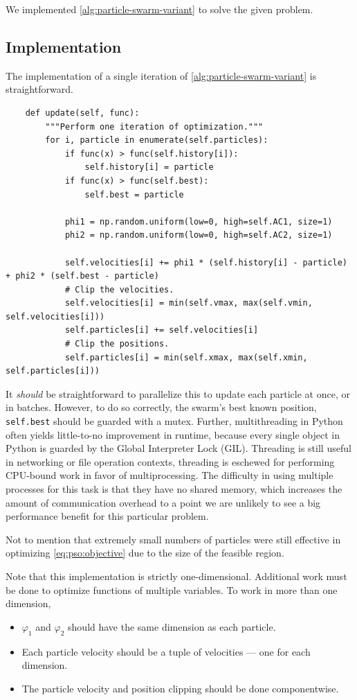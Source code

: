 \documentclass[12pt]{article}
\begin{document}
We implemented \autoref{alg:particle-swarm-variant} to solve the given problem.

\subsection{Implementation}

The implementation of a single iteration of \autoref{alg:particle-swarm-variant} is straightforward.

\begin{verbatim}
    def update(self, func):
        """Perform one iteration of optimization."""
        for i, particle in enumerate(self.particles):
            if func(x) > func(self.history[i]):
                self.history[i] = particle
            if func(x) > func(self.best):
                self.best = particle

            phi1 = np.random.uniform(low=0, high=self.AC1, size=1)
            phi2 = np.random.uniform(low=0, high=self.AC2, size=1)

            self.velocities[i] += phi1 * (self.history[i] - particle) + phi2 * (self.best - particle)
            # Clip the velocities.
            self.velocities[i] = min(self.vmax, max(self.vmin, self.velocities[i]))
            self.particles[i] += self.velocities[i]
            # Clip the positions.
            self.particles[i] = min(self.xmax, max(self.xmin, self.particles[i]))
\end{verbatim}

It \textit{should} be straightforward to parallelize this to update each particle at once, or in batches.
However, to do so correctly, the swarm's best known position, \texttt{self.best} should be guarded with a mutex.
Further, multithreading in Python often yields little-to-no improvement in runtime, because every single object in Python is guarded by the Global Interpreter Lock (GIL).
Threading is still useful in networking or file operation contexts, threading is eschewed for performing CPU-bound work in favor of multiprocessing.
The difficulty in using multiple processes for this task is that they have no shared memory, which increases the amount of communication overhead to a point we are unlikely to see a big performance benefit for this particular problem.

Not to mention that extremely small numbers of particles were still effective in optimizing \autoref{eq:pso:objective} due to the size of the feasible region.

Note that this implementation is strictly one-dimensional.
Additional work must be done to optimize functions of multiple variables.
To work in more than one dimension,
\begin{itemize}
    \item $\varphi_1$ and $\varphi_2$ should have the same dimension as each particle.
    \item Each particle velocity should be a tuple of velocities --- one for each dimension.
    \item The particle velocity and position clipping should be done componentwise.
\end{itemize}
\end{document}

